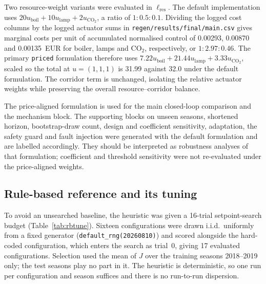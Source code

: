 Two resource-weight variants were evaluated in $\ell_{\mathrm{res}}$. The default
implementation uses
$20u_{\mathrm{boil}}+10u_{\mathrm{lamp}}+2u_{\mathrm{CO}_2}$, a ratio of $1:0.5:0.1$.
Dividing the logged cost columns by the logged actuator sums in
\texttt{regen/results/final/main.csv} gives marginal costs per unit of accumulated
normalised control of 0.00293, 0.00870 and 0.00135~EUR for boiler, lamps and CO$_2$,
respectively, or $1:2.97:0.46$. The primary \texttt{priced} formulation therefore uses
$7.22u_{\mathrm{boil}}+21.44u_{\mathrm{lamp}}+3.33u_{\mathrm{CO}_2}$, scaled so the total
at $u=(1,1,1)$ is 31.99 against 32.0 under the default formulation. The corridor term is
unchanged, isolating the relative actuator weights while preserving the overall
resource--corridor balance.

The price-aligned formulation is used for the main closed-loop comparison and the
mechanism block. The supporting blocks on unseen seasons, shortened horizon,
bootstrap-draw count, design and coefficient sensitivity, adaptation, the safety guard and
fault injection were generated with the default formulation and are labelled accordingly.
They should be interpreted as robustness analyses of that formulation; coefficient and
threshold sensitivity were not re-evaluated under the price-aligned weights.

\subsection{Rule-based reference and its tuning}
\label{sec:rbtune}

To avoid an unsearched baseline, the heuristic was given a 16-trial setpoint-search budget
(Table~\ref{tab:rbtune}). Sixteen configurations were drawn i.i.d.\ uniformly from
a fixed generator (\texttt{default\_rng(20260810)}) and scored alongside the hard-coded
configuration, which enters the search as trial~0, giving 17 evaluated configurations.
Selection used the mean of $J$ over the training seasons 2018--2019 only; the test seasons
play no part in it. The heuristic is deterministic, so one run per configuration and season
suffices and there is no run-to-run dispersion.


